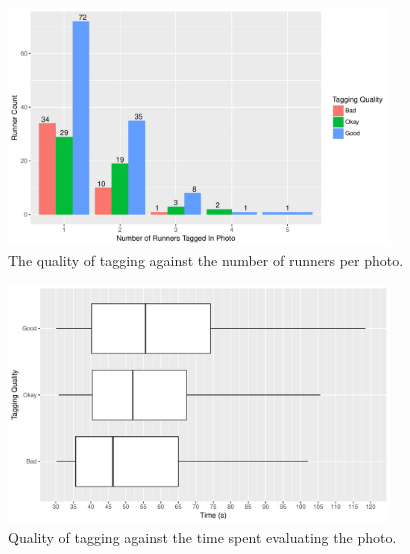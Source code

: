 \begin{figure}[p]
  \centering
  \includegraphics[width=0.9\textwidth]{images/dataset/argus/quality_of_tagging_count}
  \caption[Quality of tagging related the number of runners per photo]{The quality of tagging against the number of runners per photo.}
  \label{fig:dataset:argus:quality_of_tagging_count}
\end{figure}

\begin{figure}[p]
  \centering
  \includegraphics[width=0.9\textwidth]{images/dataset/argus/quality_of_tagging_time}
  \caption[Quality of tagging and seconds evaluating the photo]{Quality of tagging against the time spent evaluating the photo.}
  \label{fig:dataset:argus:quality_of_tagging_time}
\end{figure}

\clearpage